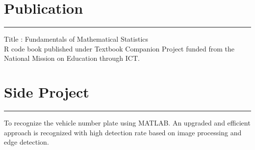\documentclass[]{meetresume-class}
\begin{document}
\begin{minipage}[t]{0.66\textwidth}
		\section{Publication} 
		\noindent\rule{12.5cm}{0.4pt}
		 
		\noindent
		\hspace{5em}%
		\begin{minipage}{0.85\textwidth\vspace{2pt}}
			Title : Fundamentals of Mathematical Statistics\\
			R code book published under Textbook Companion Project funded
			from the National Mission on Education through ICT.
		\end{minipage}
		\section{Side Project}
		\noindent\rule{12.5cm}{0.4pt}
		 
		\noindent
		\hspace{5em}%
		\begin{minipage}{0.85\textwidth\vspace{5pt}}
			To recognize the vehicle number plate using MATLAB. An upgraded and
			efficient approach is recognized with high detection rate based on image
			processing and edge detection.
		\end{minipage}
	\end{minipage} 
\end{document}
